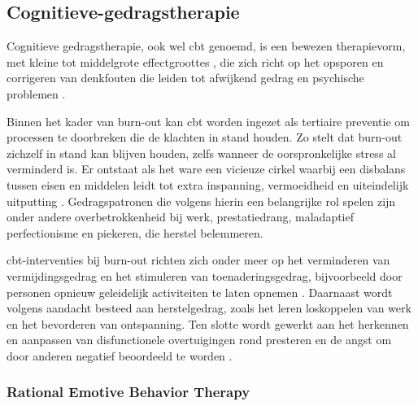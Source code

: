 \vspace{1em}

\subsection{Cognitieve-gedragstherapie}
\label{subsec:cgt}

\vspace{1em}

Cognitieve gedragstherapie, ook wel \acrshort{cbt} genoemd, is een bewezen therapievorm, met kleine tot middelgrote effectgroottes \autocite{Madigan2023}, die zich richt op het opsporen en corrigeren van denkfouten die leiden tot afwijkend gedrag en psychische problemen \autocite{foolen-2013}.

\vspace{1em}

Binnen het kader van burn-out kan \acrshort{cbt} worden ingezet als tertiaire preventie om processen te doorbreken die de klachten in stand houden. Zo stelt \textcite{Almen2021} dat burn-out zichzelf in stand kan blijven houden, zelfs wanneer de oorspronkelijke stress al verminderd is. Er ontstaat als het ware een vicieuze cirkel waarbij een disbalans tussen eisen en middelen leidt tot extra inspanning, vermoeidheid en uiteindelijk uitputting \autocite{Almen2021}. Gedragspatronen die volgens \textcite{Almen2021} hierin een belangrijke rol spelen zijn onder andere overbetrokkenheid bij werk, prestatiedrang, maladaptief perfectionisme en piekeren, die herstel belemmeren.

\vspace{1em}

\acrshort{cbt}-interventies bij burn-out richten zich onder meer op het verminderen van vermijdingsgedrag en het stimuleren van toenaderingsgedrag, bijvoorbeeld door personen opnieuw geleidelijk activiteiten te laten opnemen \autocite{Almen2021}. Daarnaast wordt volgens \textcite{Almen2021} aandacht besteed aan herstelgedrag, zoals het leren loskoppelen van werk en het bevorderen van ontspanning. Ten slotte wordt gewerkt aan het herkennen en aanpassen van disfunctionele overtuigingen rond presteren en de angst om door anderen negatief beoordeeld te worden \autocite{Almen2021}.

\vspace{1em}

\subsubsection{Rational Emotive Behavior Therapy}
\label{subsubsec:rebt}

